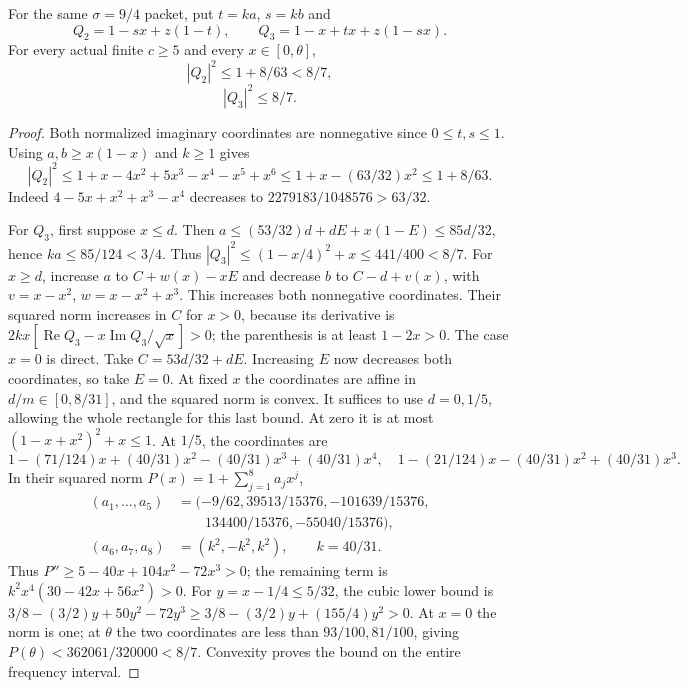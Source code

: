 \begin{lemma}
\label{lem:reference-retained:short-norms}
For the same $\sigma=9/4$ packet, put $t=ka$, $s=kb$ and
\[
 Q_2=1-sx+z(1-t),\qquad
 Q_3=1-x+tx+z(1-sx).
\]
For every actual finite $c\ge5$ and every $x\in[0,\theta]$,
\begin{equation}\label{eq:retained-reference:Q2-tight}
 |Q_2|^2\le1+8/63<8/7,
\end{equation}
\begin{equation}\label{eq:retained-reference:Q3-tight}
 |Q_3|^2\le8/7.
\end{equation}
\end{lemma}
\begin{proof}
Both normalized imaginary coordinates are nonnegative since
$0\le t,s\le1$. Using $a,b\ge x(1-x)$ and $k\ge1$ gives
\[
 |Q_2|^2\le1+x-4x^2+5x^3-x^4-x^5+x^6
 \le1+x-(63/32)x^2\le1+8/63.
\]
Indeed $4-5x+x^2+x^3-x^4$ decreases to
$2279183/1048576>63/32$.

For $Q_3$, first suppose $x\le d$.
Then $a\le(53/32)d+dE+x(1-E)\le85d/32$, hence
$ka\le85/124<3/4$. Thus
$|Q_3|^2\le(1-x/4)^2+x\le441/400<8/7$.
For $x\ge d$, increase $a$ to $C+w(x)-xE$ and decrease
$b$ to $C-d+v(x)$, with $v=x-x^2$, $w=x-x^2+x^3$.
This increases both nonnegative coordinates. Their squared norm
increases in $C$ for $x>0$, because its derivative is
$2kx[\operatorname{Re}Q_3-x\operatorname{Im}Q_3/\sqrt x]>0$;
the parenthesis is at least $1-2x>0$.
The case $x=0$ is direct.
Take $C=53d/32+dE$. Increasing $E$ now decreases both coordinates,
so take $E=0$. At fixed $x$ the coordinates are affine in
$d/m\in[0,8/31]$, and the squared norm is convex. It suffices to
use $d=0,1/5$, allowing the whole rectangle for this last bound.
At zero it is at most $(1-x+x^2)^2+x\le1$.
At $1/5$, the coordinates are
\[
 1-(71/124)x+(40/31)x^2-(40/31)x^3+(40/31)x^4,
 \quad 1-(21/124)x-(40/31)x^2+(40/31)x^3.
\]
In their squared norm $P(x)=1+\sum_{j=1}^8 a_jx^j$,
\[
\begin{aligned}
 (a_1,\ldots,a_5)
 &=(-9/62,39513/15376,-101639/15376,\\
 &\hspace{2em}134400/15376,-55040/15376),\\
 (a_6,a_7,a_8)&=(k^2,-k^2,k^2),\qquad k=40/31.
\end{aligned}
\]
Thus $P''\ge5-40x+104x^2-72x^3>0$; the remaining term is
$k^2x^4(30-42x+56x^2)>0$.
For $y=x-1/4\le5/32$, the cubic lower bound is
$3/8-(3/2)y+50y^2-72y^3
\ge3/8-(3/2)y+(155/4)y^2>0$.
At $x=0$ the norm is one; at $\theta$ the two coordinates are
less than $93/100,81/100$, giving
$P(\theta)<362061/320000<8/7$.
Convexity proves the bound on the entire frequency interval.
\end{proof}
